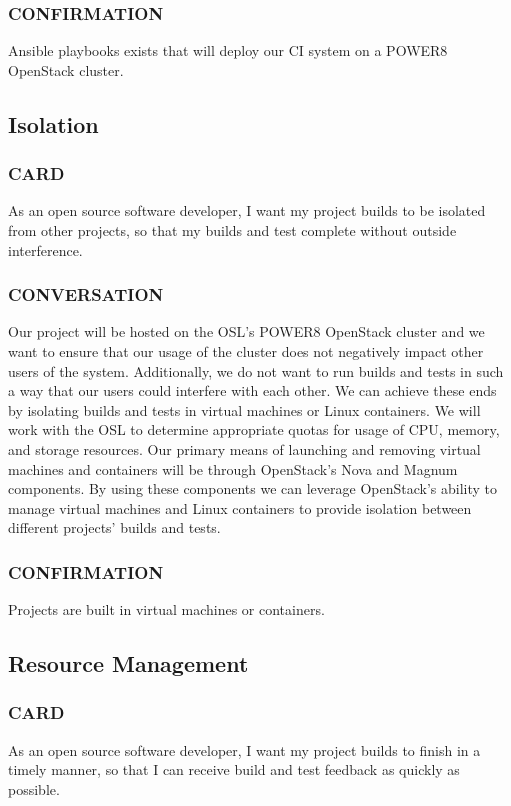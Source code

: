 \documentclass[10pt,letterpaper,onecolumn,journal]{IEEEtran}
\begin{document}
\subsubsection{CONFIRMATION}
Ansible playbooks exists that will deploy our CI system on a POWER8 OpenStack cluster.

\subsection{Isolation}
\subsubsection{CARD}
As an open source software developer, I want my project builds to be isolated from other projects, so that my builds and test complete without outside interference.
\subsubsection{CONVERSATION}
Our project will be hosted on the OSL's POWER8 OpenStack cluster and we want to ensure that our usage of the cluster does not negatively impact other users of the system.
Additionally, we do not want to run builds and tests in such a way that our users could interfere with each other.
We can achieve these ends by isolating builds and tests in virtual machines or Linux containers.
We will work with the OSL to determine appropriate quotas for usage of CPU, memory, and storage resources.
Our primary means of launching and removing virtual machines and containers will be through OpenStack's Nova and Magnum components.
By using these components we can leverage OpenStack's ability to manage virtual machines and Linux containers to provide isolation between different projects' builds and tests.
\subsubsection{CONFIRMATION}
Projects are built in virtual machines or containers.

\subsection{Resource Management}
\subsubsection{CARD}
As an open source software developer, I want my project builds to finish in a timely manner, so that I can receive build and test feedback as quickly as possible.
\end{document}
